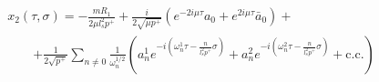 \begin{equation}
\begin{array}{l}
x_2(\tau,\sigma) = \displaystyle{
     - \frac{m R_1}{2 \mu l_s^2 p^+}  + 
   \frac{i}{2 \sqrt{\mu p^+}}  
              \left( e^{-2 i \mu \tau} a_0 +  e^{2 i \mu \tau} \bar{a}_0  \right)}+ \\
\qquad  \displaystyle{
       +  \frac{1}{2 \sqrt{p^+}} \sum_{n \neq 0}
      \frac{1}{\omega_n^{1/2}} \left( 
               a^1_n e^{-i \left(\omega^1_n \tau - \frac{n}{l_s^2 p^+} \sigma \right)} + 
               a^2_n e^{-i \left(\omega^2_n \tau - \frac{n}{l_s^2 p^+} \sigma \right)} 
                      + \textrm{c.c.} \right) }
\end{array}
\end{equation}

